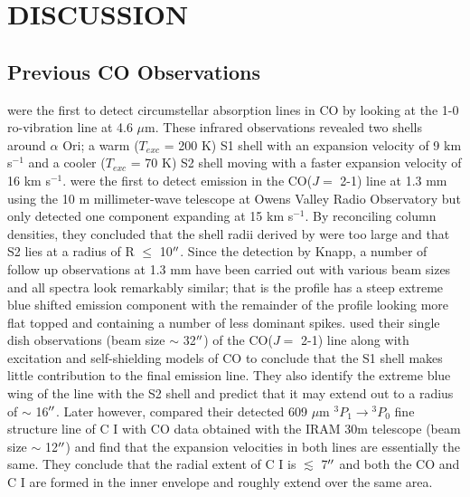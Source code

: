 \documentclass[iop]{emulateapj}
\begin{document}
\section{DISCUSSION}
\subsection{Previous CO Observations}
\cite{1979ApJ...233L.135B} were the first to detect circumstellar absorption lines in CO by looking at the 1-0 ro-vibration line at 4.6 $\mu$m. These infrared observations revealed two shells around $\alpha$ Ori; a warm (\rm{$T_{exc}$} = 200 K) S1 shell with an expansion velocity of 9 km s${}^{-1}$ and a cooler (\rm{$T_{exc}$} = 70 K) S2 shell moving with a faster expansion velocity of 16 km s${}^{-1}$.   \cite{1980ApJ...242L..25K} were the first to detect emission in the CO($J=$ 2-1) line at 1.3 mm using the 10 m millimeter-wave telescope at Owens Valley Radio Observatory but only detected one component expanding at 15 km s${}^{-1}$. By reconciling column densities, they concluded that the shell radii derived by \cite{1979ApJ...233L.135B} were too large and that S2 lies at a radius of R $\leq$ 10$\mbox{$^{\prime\prime}$}$. Since the detection by Knapp, a number of follow up observations at 1.3 mm have been carried out with various beam sizes and all spectra look remarkably similar; that is the profile has a steep extreme blue shifted emission component with the remainder of the profile looking more flat topped and containing a number of less dominant spikes. \cite{1987ApJ...313..400H} used their single dish observations (beam size $\sim$ 32$\mbox{$^{\prime\prime}$}$) of the CO($J=$ 2-1) line along with excitation and self-shielding models of CO to conclude that the S1 shell makes little contribution to the final emission line. They also identify the extreme blue wing of the line with the S2 shell and predict that it may extend out to a radius of $\sim$ 16$\mbox{$^{\prime\prime}$}$. Later however, \cite{1994ApJ...424L.127H} compared their detected 609 $\mu$m ${}^3P{}_1\rightarrow{}^3P{}_0$ fine structure line of C I with CO data obtained with the IRAM 30m telescope (beam size $\sim$ 12$\mbox{$^{\prime\prime}$}$) and find that the expansion velocities in both lines are essentially the same. They conclude that the radial extent of C I is $\lesssim$ 7$\mbox{$^{\prime\prime}$}$ and both the CO and C I are formed in the inner envelope and roughly extend over the same area.  
\end{document}

